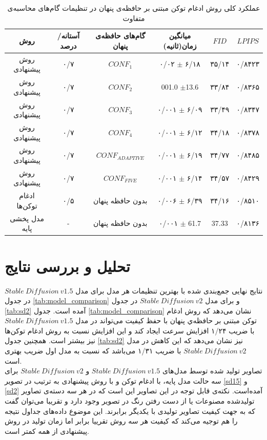 \begin{table}[h!]
	\centering
	\caption{عملکرد کلی روش ادغام توکن مبتنی بر حافظه‌ی پنهان در تنظیمات گام‌های محاسبه‌ی متفاوت}
	\begin{tabular}{|c|c|c|c|c|c|}
		\hline
		\textbf{روش} & \textbf{آستانه/درصد} & \textbf{گام‌های حافظه‌ی پنهان} & \textbf{میانگین زمان(ثانیه)} & \textbf{$FID$} & \textbf{$LPIPS$} \\ \hline
		روش پیشنهادی & ۰/۷ & $CONF_1$ & ۰/۰۲ $\pm$ ۶/۱۸  & ۳۵/۱۴ & ۰/۸۴۲۳ \\ \hline
		روش پیشنهادی & ۰/۷ & $CONF_2$ & 001.0 $\pm$13.6   & ۳۳/۸۴ & ۰/۸۳۶۵ \\ \hline
		روش پیشنهادی & ۰/۷ & $CONF_3$ & \cellcolor{gray!30}۰/۰۰۱ $\pm$  ۶/۰۹ & \cellcolor{gray!30}۳۳/۴۹ & \cellcolor{gray!30}۰/۸۳۴۷ \\ \hline
		روش پیشنهادی & ۰/۷ & $CONF_4$ & ۰/۰۰۱ $\pm$ ۶/۱۲   & ۳۴/۱۸ & ۰/۸۳۷۸ \\ \hline
		روش پیشنهادی & ۰/۷ & $CONF_{ADAPTIVE}$ & ۰/۰۰۱ $\pm$ ۶/۱۹ & ۳۴/۷۷& ۰/۸۴۸۵ \\ \hline
		روش پیشنهادی & ۰/۷ & $CONF_{FIVE}$ &  ۰/۰۰۱ $\pm$ ۶/۱۴  & ۳۴/۵۷ & ۰/۸۴۲۹ \\ \hline
		ادغام توکن‌ها & ۰/۵ & بدون حافظه پنهان & ۰/۰۰۶ $\pm$ ۶/۳۹ & ۳۴/۱۶ & ۰/۸۵۱۰ \\ \hline
		مدل پخشی پایه & - & بدون حافظه پنهان & ۰/۰۰۱ $\pm$ 61.7 & 37.33 & ۰/۸۱۳۶ \\ \hline
	\end{tabular}
	\label{tab:performance}
\end{table}

\section{تحلیل و بررسی نتایج}
نتایج نهایی جمع‌بندی شده با بهترین تنظیمات هر مدل برای مدل $Stable\ Diffusion\ v1.5$ در جدول \ref{tab:model_comparison} و برای مدل $Stable\ Diffusion\ v2$ در جدول \ref{tab:sd2} آمده است. جدول  \ref{tab:model_comparison} نشان می‌دهد که روش ادغام توکن مبتنی بر حافظه‌ي پنهان با حفظ کیفیت می‌تواند در مدل $Stable\ Diffusion\ v1.5$  با ضریب ۱/۲۴ افزایش سرعت ایجاد کند و این افزایش نسبت به روش ادغام توکن‌ها نیز بیشتر است. همچنین جدول \ref{tab:sd2} نیز نشان‌ می‌دهد که این کاهش در مدل $Stable\ Diffusion\ v2$ با ضریب ۱/۳۱ می‌باشد که نسبت به مدل اول ضریب بهتری است. 
\\
تصاویر تولید شده توسط مدل‌های $Stable\ Diffusion\ v1.5$ و $Stable\ Diffusion\ v2$ برای سه حالت مدل پایه، با ادغام توکن و با روش پیشنهادی به ترتیب در تصویر \ref{sd15} و \ref{sd2} آمده‌است. نکته‌ی قابل توجه در این تصاویر این است که در هر سه دسته‌ی تصاویر تولید‌شده مصنوعات یا از دست رفتن رنگ در تصویر وجود دارد و تقریبا می‌توان گفت که به جهت کیفیت تصاویر تولیدی با یکدیگر برابرند. این موضوع داده‌های جداول نتیجه را هم توجیه می‌کند که کیفیت هر سه روش تقرییا برابر اما زمان تولید در روش پیشنهادی از همه کمتر است.
\\

